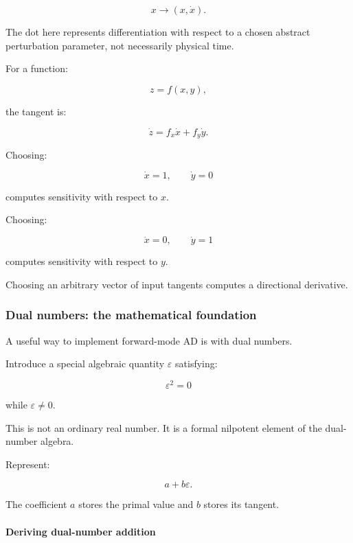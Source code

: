 \[
x\longrightarrow(x,\dot x).
\]

The dot here represents differentiation with respect to a chosen abstract perturbation parameter, not necessarily physical time.

For a function:

\[
z=f(x,y),
\]

the tangent is:

\[
\dot z=f_x\dot x+f_y\dot y.
\]

Choosing:

\[
\dot x=1,\qquad \dot y=0
\]

computes sensitivity with respect to \(x\).

Choosing:

\[
\dot x=0,\qquad \dot y=1
\]

computes sensitivity with respect to \(y\).

Choosing an arbitrary vector of input tangents computes a directional derivative.

\subsubsection{Dual numbers: the mathematical foundation}\label{02-foundations-ii-ch022-dual-numbers-the-mathematical-foundation}

\hypertarget{02-foundations-ii-ch022-dual-numbers-the-mathematical-foundation}{}

A useful way to implement forward-mode AD is with dual numbers.

Introduce a special algebraic quantity \(\varepsilon\) satisfying:

\[
\boxed{\varepsilon^2=0}
\]

while \(\varepsilon\ne0\).

This is not an ordinary real number. It is a formal nilpotent element of the dual-number algebra.

Represent:

\[
a+b\varepsilon.
\]

The coefficient \(a\) stores the primal value and \(b\) stores its tangent.

\paragraph{Deriving dual-number addition}\label{02-foundations-ii-ch022-deriving-dual-number-addition}

\hypertarget{02-foundations-ii-ch022-deriving-dual-number-addition}{}

